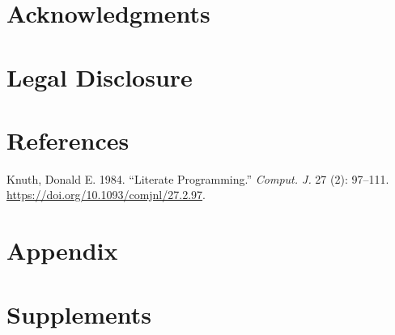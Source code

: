 \documentclass[
  a4paper,
]{article}
\newlength{\cslhangindent}
\newenvironment{CSLReferences}[2] %
 {\begin{list}{}{%
  \setlength{\itemindent}{0pt}
  \setlength{\leftmargin}{0pt}
  \setlength{\parsep}{0pt}
  \ifodd #1
   \setlength{\leftmargin}{\cslhangindent}
   \setlength{\itemindent}{-1\cslhangindent}
  \fi
  \setlength{\itemsep}{#2\baselineskip}}}
 {\end{list}}
\begin{document}
\section{Acknowledgments}\label{acknowledgments}

\section{Legal Disclosure}\label{legal-disclosure}

\section*{References}\label{references}

\label{refs}
\begin{CSLReferences}{1}{0}
Knuth, Donald E. 1984. {``Literate Programming.''} \emph{Comput. J.} 27
(2): 97--111. \url{https://doi.org/10.1093/comjnl/27.2.97}.

\end{CSLReferences}

\section{Appendix}\label{appendix}

\section{Supplements}\label{supplements}
\end{document}
